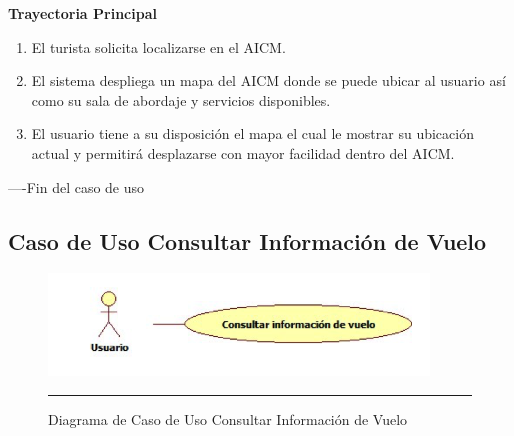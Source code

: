 \begin{flushleft}
	\textbf{Trayectoria Principal}\\
	\begin{enumerate}
		\item El turista solicita localizarse en el AICM.
		\item El sistema despliega un mapa del AICM donde se puede ubicar al usuario así como su sala de abordaje y servicios disponibles.
		\item El usuario tiene a su disposición el mapa el cual le mostrar su ubicación actual y permitirá desplazarse con mayor facilidad dentro del AICM.
	\end{enumerate}
\end{flushleft}
----Fin del caso de uso
\newpage
\subsection{Caso de Uso Consultar Información de Vuelo}

\begin{figure}[htbp]
	\centering
		\includegraphics[width=0.9\textwidth]{Figuras/cuConsultarInformacionVuelo.png}
		\rule{30em}{0.5pt}
	\caption[Diagrama de Caso de Uso Consultar Información de Vuelo]{Diagrama de Caso de Uso Consultar Información de Vuelo}
	\label{fig:cuConsultarInformacionVuelo}
\end{figure}

